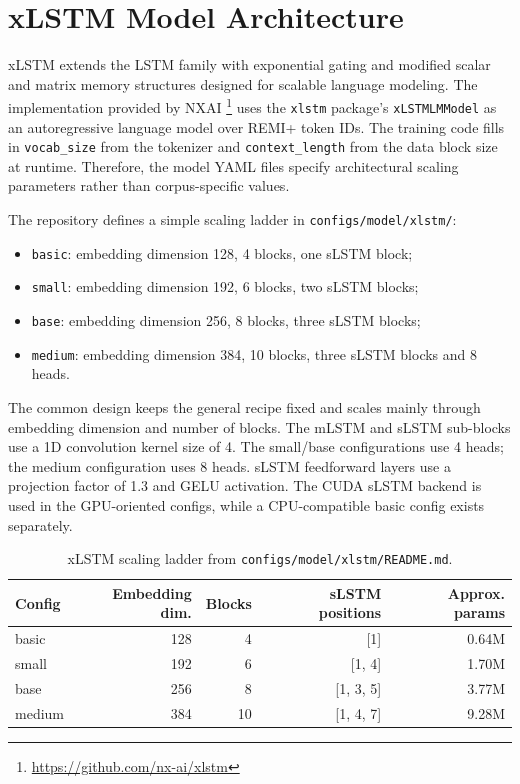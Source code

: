 \section{xLSTM Model Architecture}

xLSTM \citep{beckXLSTMExtendedLong2024} extends the LSTM \citep{hochreiterLongShortTermMemory1997} family with exponential gating and modified scalar and matrix memory structures designed for scalable language modeling. The implementation provided by NXAI \footnote{\url{https://github.com/nx-ai/xlstm}} uses the \verb|xlstm| package's \verb|xLSTMLMModel| as an autoregressive language model over REMI+ token IDs. The training code fills in \verb|vocab_size| from the tokenizer and \verb|context_length| from the data block size at runtime. Therefore, the model YAML files specify architectural scaling parameters rather than corpus-specific values.

The repository defines a simple scaling ladder in \verb|configs/model/xlstm/|:
\begin{itemize}
	\item \verb|basic|: embedding dimension 128, 4 blocks, one sLSTM block;
	\item \verb|small|: embedding dimension 192, 6 blocks, two sLSTM blocks;
	\item \verb|base|: embedding dimension 256, 8 blocks, three sLSTM blocks;
	\item \verb|medium|: embedding dimension 384, 10 blocks, three sLSTM blocks and 8 heads.
\end{itemize}

The common design keeps the general recipe fixed and scales mainly through embedding dimension and number of blocks. The mLSTM and sLSTM sub-blocks use a 1D convolution kernel size of 4. The small/base configurations use 4 heads; the medium configuration uses 8 heads. sLSTM feedforward layers use a projection factor of 1.3 and GELU activation. The CUDA sLSTM backend is used in the GPU-oriented configs, while a CPU-compatible basic config exists separately.

\begin{table}[h]
	\centering
	\begin{tabular}{lrrrr}
		\toprule
		Config & Embedding dim. & Blocks & sLSTM positions & Approx. params \\
		\midrule
		basic  & 128            & 4      & [1]             & 0.64M          \\
		small  & 192            & 6      & [1, 4]          & 1.70M          \\
		base   & 256            & 8      & [1, 3, 5]       & 3.77M          \\
		medium & 384            & 10     & [1, 4, 7]       & 9.28M          \\
		\bottomrule
	\end{tabular}
	\caption{xLSTM scaling ladder from \texttt{configs/model/xlstm/README.md}.}
	\label{tab:xlstm_scale}

\end{table}

